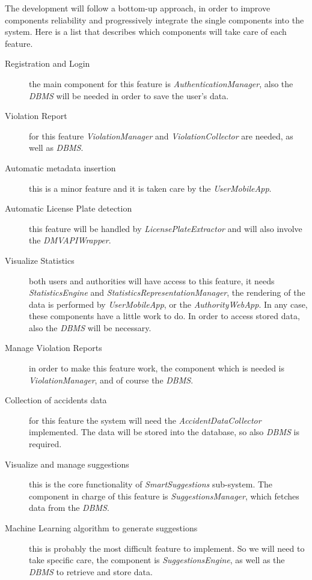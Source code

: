 The development will follow a bottom-up approach, in order to improve components
reliability and progressively integrate the single components into the system.
Here is a list that describes which components will take care of each feature.
\begin{description}
    \item[Registration and Login] the main component for this feature is
        \emph{AuthenticationManager}, also the \emph{DBMS} will be needed in
        order to save the user's data.
    \item[Violation Report] for this feature \emph{ViolationManager} 
        and \emph{ViolationCollector} are needed, as well as \emph{DBMS}.
    \item[Automatic metadata insertion] this is a minor feature and it is taken
        care by the \emph{UserMobileApp}.
    \item[Automatic License Plate detection] this feature will be handled by
        \emph{LicensePlateExtractor} and will also involve the
        \emph{DMVAPIWrapper}.
    \item[Visualize Statistics] both users and authorities will have access to
        this feature, it needs \emph{StatisticsEngine} and
        \emph{StatisticsRepresentationManager}, the rendering of the data is
        performed by \emph{UserMobileApp}, or the \emph{AuthorityWebApp}. In any
        case, these components have a little work to do. In order to access
        stored data, also the \emph{DBMS} will be necessary.
    \item[Manage Violation Reports] in order to make this feature work, the
        component which is needed is \emph{ViolationManager}, and of course the
        \emph{DBMS}.
    \item[Collection of accidents data] for this feature the system will need
        the \emph{AccidentDataCollector} implemented. The data will be stored
        into the database, so also \emph{DBMS} is required.
    \item[Visualize and manage suggestions] this is the core functionality of
        \emph{SmartSuggestions} sub-system. The component in charge of this
        feature is \emph{SuggestionsManager}, which fetches data from the
        \emph{DBMS}.
    \item[Machine Learning algorithm to generate suggestions] this is probably
        the most difficult feature to implement. So we will need to take
        specific care, the component is \emph{SuggestionsEngine}, as well as the
        \emph{DBMS} to retrieve and store data.
\end{description}